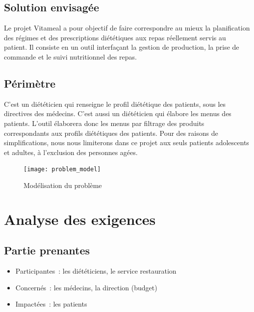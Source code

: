 \subsection{Solution envisagée}
Le projet Vitameal a pour objectif de faire correspondre au mieux la planification des régimes et des
prescriptions diététiques aux repas réellement servis au patient. Il consiste en un outil interfaçant la
gestion de production, la prise de commande et le suivi nutritionnel des repas.

\subsection{Périmètre}
C'est un diététicien qui renseigne le profil diététique des patients,
sous les directives des médecins. C'est aussi un diététicien qui élabore
les menus des patients. L'outil élaborera donc
les menus par filtrage des produits correspondants aux profils
diététiques des patients. Pour des raisons de simplifications, nous nous limiterons dans ce projet aux seuls patients adolescents et adultes, à l'exclusion des personnes agées.
\begin{figure}[H]
\label{Modelisation_du _probleme}
  \centering
      \texttt{[image: problem\_model]} %
\caption{Modélisation du problème}
\end{figure}

\section{Analyse des exigences}
\subsection{Partie prenantes}
\begin{itemize}
\item Participantes~: les diététiciens, le service restauration
\item Concernés~: les médecins, la direction (budget)
\item Impactées~: les patients
\end{itemize}


